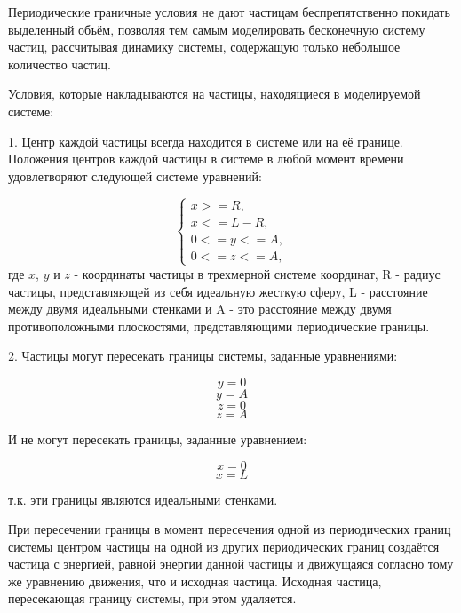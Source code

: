 \documentclass{article}
\begin{document}
Периодические граничные условия не дают частицам беспрепятственно покидать выделенный объём, позволяя тем самым моделировать бесконечную систему частиц, рассчитывая динамику системы, содержащую только небольшое количество частиц.

Условия, которые накладываются на частицы, находящиеся в моделируемой системе:

1. Центр каждой частицы всегда находится в системе или на её границе. Положения центров каждой частицы в системе в любой момент времени удовлетворяют следующей системе уравнений:

\begin{equation}
    \begin{cases}
        x >= R,
        \\
        x <= L - R,
        \\
        0 <= y <= A,
        \\
        0 <= z <= A,
    \end{cases}
\end{equation}
где $ x $, $ y $ и $ z $ - координаты частицы в трехмерной системе координат, R - радиус частицы, представляющей из себя идеальную жесткую сферу, L - расстояние между двумя идеальными стенками и A - это расстояние между двумя противоположными плоскостями, представляющими периодические границы.

2. Частицы могут пересекать границы системы, заданные уравнениями:

\begin{equation}
y = 0
\end{equation}
\begin{equation}
y = A
\end{equation}
\begin{equation}
z = 0
\end{equation}
\begin{equation}
z = A
\end{equation}

И не могут пересекать границы, заданные уравнением:

\begin{equation}
x = 0
\end{equation}
\begin{equation}
x = L
\end{equation}

т.к. эти границы являются идеальными стенками. 

При пересечении границы в момент пересечения одной из периодических границ системы центром частицы на одной из других периодических границ создаётся частица с энергией, равной энергии данной частицы и движущаяся согласно тому же уравнению движения, что и исходная частица. Исходная частица, пересекающая границу системы, при этом удаляется.
\end{document}
